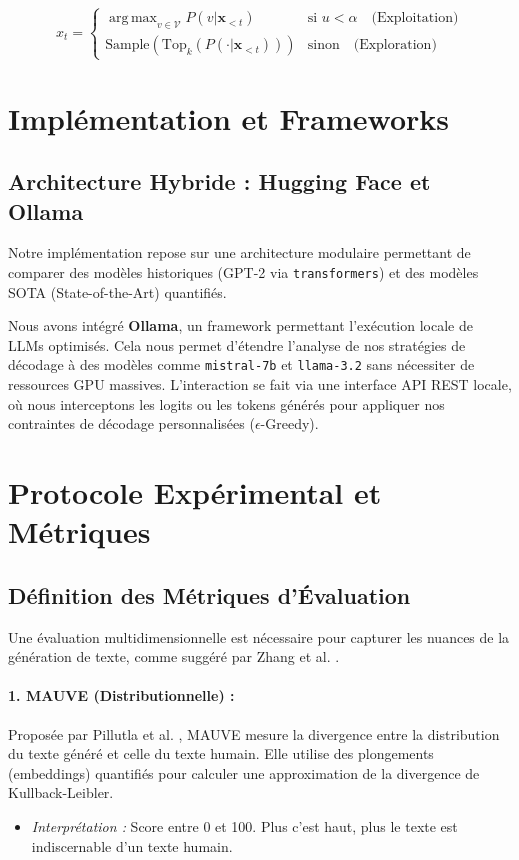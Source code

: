 \documentclass[12pt,a4paper]{article}
\newcommand{\vocab}{\mathcal{V}}
\DeclareMathOperator*{\argmax}{arg\,max}
\begin{document}
\begin{equation}
    x_t = \begin{cases} 
    \displaystyle \argmax_{v \in \vocab} P(v | \mathbf{x}_{<t}) & \text{si } u < \alpha \quad \text{(Exploitation)} \\[10pt]
    \displaystyle \text{Sample}\left( \text{Top}_k(P(\cdot | \mathbf{x}_{<t})) \right) & \text{sinon} \quad \text{(Exploration)}
    \end{cases}
\end{equation}

\section{Impl\'ementation et Frameworks}

\subsection{Architecture Hybride : Hugging Face et Ollama}
Notre impl\'ementation repose sur une architecture modulaire permettant de comparer des mod\`eles historiques (GPT-2 via \texttt{transformers}) et des mod\`eles SOTA (State-of-the-Art) quantifi\'es.

Nous avons int\'egr\'e \textbf{Ollama}, un framework permettant l'ex\'ecution locale de LLMs optimis\'es. Cela nous permet d'\'etendre l'analyse de nos strat\'egies de d\'ecodage \`a des mod\`eles comme \texttt{mistral-7b} et \texttt{llama-3.2} sans n\'ecessiter de ressources GPU massives. L'interaction se fait via une interface API REST locale, o\`u nous interceptons les logits ou les tokens g\'en\'er\'es pour appliquer nos contraintes de d\'ecodage personnalis\'ees ($\epsilon$-Greedy).

\section{Protocole Exp\'erimental et M\'etriques}

\subsection{D\'efinition des M\'etriques d'\'Evaluation}
Une \'evaluation multidimensionnelle est n\'ecessaire pour capturer les nuances de la g\'en\'eration de texte, comme sugg\'er\'e par Zhang et al. \cite{zhang2019pretraining}.

\paragraph{1. MAUVE (Distributionnelle) :}
Propos\'ee par Pillutla et al. \cite{pillutla2021mauve}, MAUVE mesure la divergence entre la distribution du texte g\'en\'er\'e et celle du texte humain. Elle utilise des plongements (embeddings) quantifi\'es pour calculer une approximation de la divergence de Kullback-Leibler.
\begin{itemize}
    \item \textit{Interpr\'etation :} Score entre 0 et 100. Plus c'est haut, plus le texte est indiscernable d'un texte humain.
\end{itemize}
\end{document}
